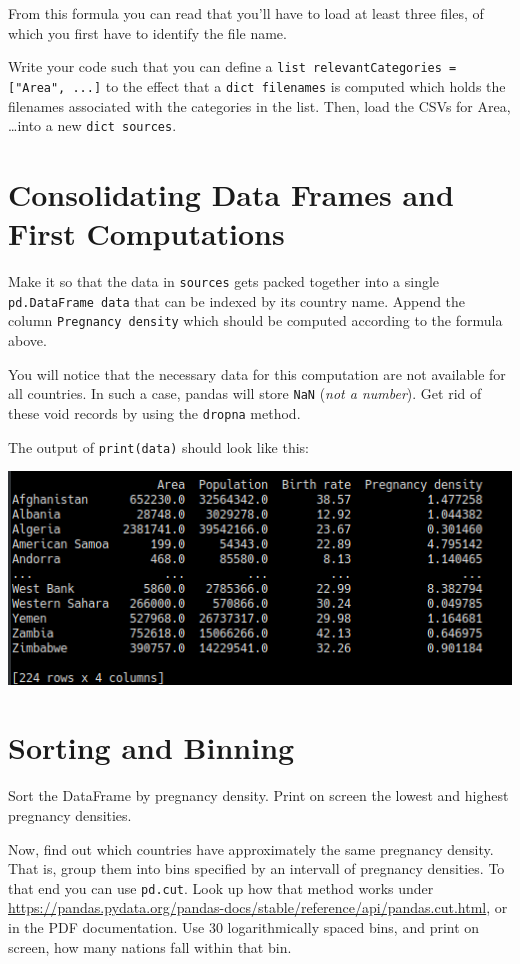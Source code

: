 \documentclass[
	english,
	fontsize=10pt,
	parskip=half,
	titlepage=true,
	DIV=12
]{scrartcl}
\newcommand*{\inPy}[1]{\texttt{#1}}
\begin{document}
From this formula you can read that you'll have to load at least three files, of which you first have to identify the file name.

Write your code such that you can define a \inPy{list relevantCategories = ["Area", ...]} to the effect that a \inPy{dict filenames} is computed which holds the filenames associated with the categories in the list. Then, load the CSVs for Area, \ldots into a new \inPy{dict sources}.

\section{Consolidating Data Frames and First Computations}
Make it so that the data in \texttt{sources} gets packed together into a single \texttt{pd.DataFrame data} that can be indexed by its country name. Append the column \texttt{Pregnancy density} which should be computed according to the formula above.

You will notice that the necessary data for this computation are not available for all countries. In such a case, pandas will store \texttt{NaN} (\emph{not a number}). Get rid of these void records by using the \texttt{dropna} method.

The output of \inPy{print(data)} should look like this:
\begin{center}
	\includegraphics[width=.6\linewidth]{./DataFrame-Minimal}
\end{center}

\section{Sorting and Binning}
Sort the DataFrame by pregnancy density. Print on screen the lowest and highest pregnancy densities.

Now, find out which countries have approximately the same pregnancy density. That is, group them into bins specified by an intervall of pregnancy densities. To that end you can use \texttt{pd.cut}. Look up how that method works under \url{https://pandas.pydata.org/pandas-docs/stable/reference/api/pandas.cut.html}, or in the PDF documentation. Use 30 logarithmically spaced bins, and print on screen, how many nations fall within that bin.
\end{document}
